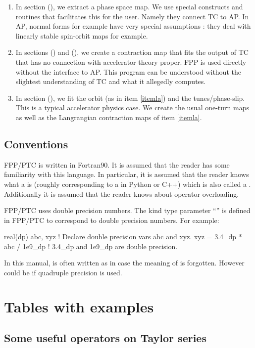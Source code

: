 \documentclass{hitec}     %
\newcommand{\Section}[1]{\section{#1}\vspace*{-1ex}}
\begin{document}
{{{ \begin{enumerate}
 \item In section (), we extract a phase space map.  We use special constructs  and routines  that facilitates this for the user. Namely they connect TC to AP. In AP, normal forms for example have very special assumptions : they deal with linearly stable spin-orbit maps for example.
 \item\label{itemla} In sections () and (), we create a contraction map that fits the output of TC  that has no connection with accelerator theory proper. FPP is used directly without the interface to AP. This program can be understood without the slightest understanding of TC and what it allegedly computes.
 \item In  section (), we fit the orbit (as in item \ref{itemla}) and the tunes/phase-slip. This is a typical accelerator physics case. We create the usual one-turn maps as well as the Langrangian contraction maps of item \ref{itemla}.
 \end{enumerate}
\subsection{Conventions}
\label{s:conventions}

FPP/PTC is written in Fortran90. It is assumed that the reader has some familiarity with this
language. In particular, it is assumed that the reader knows what a  is (roughly
corresponding to a  in Python or C++) which is also called a . Additionally it is
assumed that the reader knows about operator overloading.

FPP/PTC uses double precision numbers. The kind type parameter ``'' is defined in FPP/PTC to
correspond to double precision numbers.    For example:
\begin{code}
real(dp) abc, xyz             ! Declare double precision vars abc and xyz.
xyz = 3.4_dp * abc / 1e9_dp   ! 3.4_dp and 1e9_dp are double precision.
\end{code}

In this manual,  is often written as  in case the meaning of  is forgotten. However  could be  if quadruple precision is used.

\Section{Tables with examples}
\label{s:tables}


\subsection{Some useful operators on Taylor series}\label{s:useful}

}}}
\end{document}
